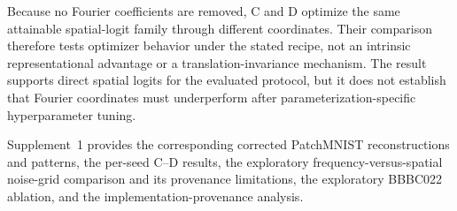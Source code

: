 \documentclass{optica-article}
\begin{document}
Because no Fourier coefficients are removed, C and D optimize the same attainable spatial-logit family through different coordinates. Their comparison therefore tests optimizer behavior under the stated recipe, not an intrinsic representational advantage or a translation-invariance mechanism. The result supports direct spatial logits for the evaluated protocol, but it does not establish that Fourier coordinates must underperform after parameterization-specific hyperparameter tuning.

\begin{table}[t]
    \centering
    \caption{
    Corrected ablation on PatchMNIST at $\times16$ compression with $T=4$ and $8\times8{:}1$ spatial downsampling.
    A and B report seed $42$; C and D report mean $\pm$ sample standard deviation across seeds $42$--$44$.
    Fourier denotes the full-spectrum coordinate reparameterization in Eq.~(\ref{eq:fourier-coordinate-parameterization}), not frequency truncation.
    Best per metric in bold.
    }
    \label{tab:ablation-study}
    \small
    \setlength{\tabcolsep}{3.5pt}
\end{table}

Supplement~1 provides the corresponding corrected PatchMNIST reconstructions and patterns, the per-seed C--D results, the exploratory frequency-versus-spatial noise-grid comparison and its provenance limitations, the exploratory BBBC022 ablation, and the implementation-provenance analysis.
\end{document}
